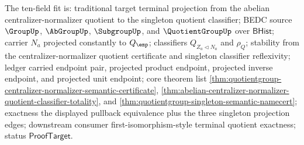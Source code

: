 The ten-field fit is: traditional target terminal projection from the abelian
centralizer-normalizer quotient to the singleton quotient classifier; BEDC
source $\GroupUp$, $\AbGroupUp$, $\SubgroupUp$, and $\QuotientGroupUp$ over
$\mathsf{BHist}$; carrier $N_a$ projected constantly to $Q_{\emp}$; classifiers
$Q_{Z_a\triangleleft N_a}$ and $\rho_Q$; stability from the
centralizer-normalizer quotient certificate and singleton classifier
reflexivity; ledger carried endpoint pair, projected product endpoint,
projected inverse endpoint, and projected unit endpoint; core theorem list
\autoref{thm:quotientgroup-centralizer-normalizer-semantic-certificate},
\autoref{thm:abelian-centralizer-normalizer-quotient-classifier-totality}, and
\autoref{thm:quotientgroup-singleton-semantic-namecert}; exactness the
displayed pullback equivalence plus the three singleton projection edges;
downstream consumer first-isomorphism-style terminal quotient exactness; status
$\mathsf{ProofTarget}$.
